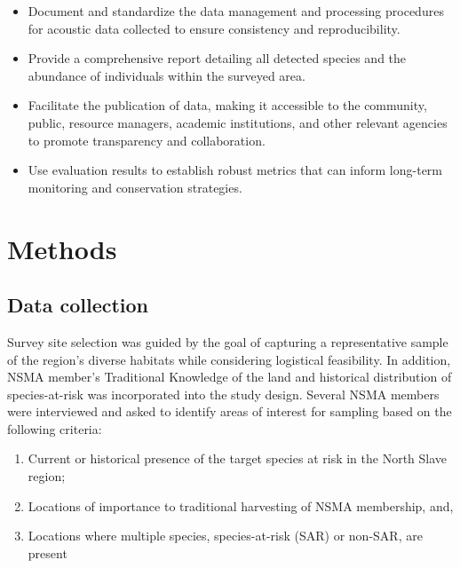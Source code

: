 \documentclass[
  letterpaper,
  DIV=11,
  numbers=noendperiod,
  oneside]{scrartcl}
\providecommand{\tightlist}{%
  \setlength{\itemsep}{0pt}\setlength{\parskip}{0pt}}
\begin{document}
\begin{itemize}
\tightlist
\item
  Document and standardize the data management and processing procedures
  for acoustic data collected to ensure consistency and reproducibility.
\item
  Provide a comprehensive report detailing all detected species and the
  abundance of individuals within the surveyed area.
\item
  Facilitate the publication of data, making it accessible to the
  community, public, resource managers, academic institutions, and other
  relevant agencies to promote transparency and collaboration.
\item
  Use evaluation results to establish robust metrics that can inform
  long-term monitoring and conservation strategies.
\end{itemize}

\section{Methods}\label{methods}

\subsection{Data collection}\label{data-collection}

Survey site selection was guided by the goal of capturing a
representative sample of the region's diverse habitats while considering
logistical feasibility. In addition, NSMA member's Traditional Knowledge
of the land and historical distribution of species-at-risk was
incorporated into the study design. Several NSMA members were
interviewed and asked to identify areas of interest for sampling based
on the following criteria:

\begin{enumerate}
\def\labelenumi{\arabic{enumi}.}
\tightlist
\item
  Current or historical presence of the target species at risk in the
  North Slave region;
\item
  Locations of importance to traditional harvesting of NSMA membership,
  and,
\item
  Locations where multiple species, species-at-risk (SAR) or non-SAR,
  are present
\end{enumerate}
\end{document}
